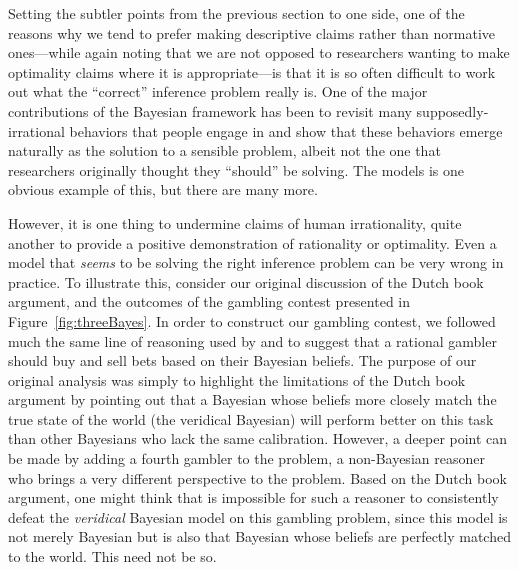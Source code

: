 \documentclass[doc,floatsintext]{apa6}
\begin{document}
Setting the subtler points from the previous section to one side, one of the reasons why we tend to prefer making descriptive claims rather than normative ones---while again noting that we are not opposed to researchers wanting to make optimality claims where it is appropriate---is that it is so often difficult to work out what the ``correct'' inference problem really is. One of the major contributions of the Bayesian framework has been to revisit many supposedly-irrational behaviors that people engage in and show that these behaviors emerge naturally as the solution to a sensible problem, albeit not the one that researchers originally thought they ``should'' be solving. The  models is one obvious example of this, but there are many more.

However, it is one thing to undermine claims of human irrationality, quite another to provide a positive demonstration of rationality or optimality. Even a model that {\it seems} to be solving the right inference problem can be very wrong in practice. To illustrate this, consider our original discussion of the Dutch book argument, and the outcomes of the gambling contest presented in Figure~\ref{fig:threeBayes}. In order to construct our gambling contest, we followed much the same line of reasoning used by  and  to suggest that a rational gambler should buy and sell bets based on their Bayesian beliefs. The purpose of our original analysis was simply to highlight the limitations of the Dutch book argument by pointing out that a Bayesian whose beliefs more closely match the true state of the world (the veridical Bayesian) will perform better on this task than other Bayesians who lack the same calibration. However, a deeper point can be made by adding a fourth gambler to the problem, a non-Bayesian reasoner who brings a very different perspective to the problem. Based on the Dutch book argument, one might think that is impossible for such a reasoner to consistently defeat the {\it veridical} Bayesian model on this gambling problem, since this model is not merely Bayesian but is also that Bayesian whose beliefs are perfectly matched to the world. This need not be so.
\end{document}

